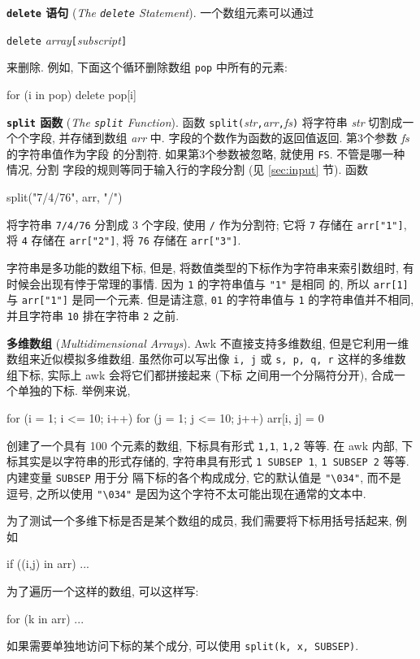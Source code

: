 \textbf{\texttt{delete} 语句} (\emph{The \texttt{delete} Statement}).
一个数组元素可以通过
\begin{pattern}
    \verb'delete' \textit{array}\verb'['\textit{subscript}\verb']'
\end{pattern}
来删除. 例如, 下面这个循环删除数组 \verb'pop' 中所有的元素:
\begin{awkcode}
    for (i in pop)
        delete pop[i]
\end{awkcode}

\textbf{\texttt{split} 函数} (\emph{The \texttt{split} Function}). 函数
\verb'split('\textit{str}\verb','\textit{arr}\verb','\textit{fs}\verb')'
将字符串 \textit{str} 切割成一个个字段, 并存储到数组 \textit{arr} 中.
字段的个数作为函数的返回值返回. 第3个参数 \textit{fs} 的字符串值作为字段
的分割符. 如果第3个参数被忽略, 就使用 \verb'FS'. 不管是哪一种情况, 分割
字段的规则等同于输入行的字段分割 (见 \ref{sec:input} 节). 函数
\begin{awkcode}
    split("7/4/76", arr, "/")
\end{awkcode}
将字符串 \verb'7/4/76' 分割成 3 个字段, 使用 \verb'/' 作为分割符; 它将
\verb'7' 存储在 \verb'arr["1"]', 将 \verb'4' 存储在 \verb'arr["2"]',
将 \verb'76' 存储在 \verb'arr["3"]'.

字符串是多功能的数组下标, 但是, 将数值类型的下标作为字符串来索引数组时,
有时候会出现有悖于常理的事情. 因为 \verb'1' 的字符串值与 \verb'"1"' 是相同
的, 所以 \verb'arr[1]' 与 \verb'arr["1"]' 是同一个元素. 但是请注意,
\verb'01' 的字符串值与 \verb'1' 的字符串值并不相同, 并且字符串 \verb'10'
排在字符串 \verb'2' 之前.

\textbf{多维数组} (\emph{Multidimensional Arrays}). Awk 不直接支持多维数组,
但是它利用一维数组来近似模拟多维数组. 虽然你可以写出像 \verb'i, j' 或
\verb's, p, q, r' 这样的多维数组下标, 实际上 awk 会将它们都拼接起来 (下标
之间用一个分隔符分开), 合成一个单独的下标. 举例来说,
\begin{awkcode}
    for (i = 1; i <= 10; i++)
        for (j = 1; j <= 10; j++)
            arr[i, j] = 0
\end{awkcode}
创建了一个具有 100 个元素的数组, 下标具有形式 \verb'1,1', \verb'1,2' 等等.
在 awk 内部, 下标其实是以字符串的形式存储的, 字符串具有形式
\verb'1 SUBSEP 1', \verb'1 SUBSEP 2' 等等. 内建变量 \verb'SUBSEP' 用于分
隔下标的各个构成成分, 它的默认值是 \verb'"\034"', 而不是 逗号, 之所以使用
\verb'"\034"' 是因为这个字符不太可能出现在通常的文本中.

为了测试一个多维下标是否是某个数组的成员, 我们需要将下标用括号括起来, 例如 
\begin{awkcode}
    if ((i,j) in arr) ...
\end{awkcode}
为了遍历一个这样的数组, 可以这样写:
\begin{awkcode}
    for (k in arr) ...
\end{awkcode}
如果需要单独地访问下标的某个成分, 可以使用 \verb'split(k, x, SUBSEP)'.

